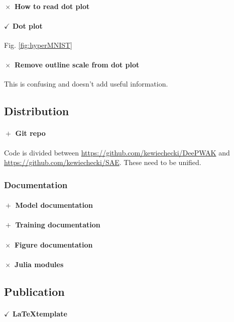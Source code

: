 \paragraph{$\boxed{\times}$ How to read dot plot}
\paragraph{$\boxed{\checkmark}$ Dot plot}
Fig. \ref{fig:hyperMNIST}
\paragraph{$\boxed{\times}$ Remove outline scale from dot plot}
This is confusing and doesn't add useful information.

\subsection{Distribution}
\paragraph{$\boxed{+}$ Git repo}
Code is divided between
\url{https://github.com/kewiechecki/DeePWAK} and
\url{https://github.com/kewiechecki/SAE}.
These need to be unified.

\subsubsection{Documentation}
\paragraph{$\boxed{+}$ Model documentation}
\paragraph{$\boxed{+}$ Training documentation}
\paragraph{$\boxed{\times}$ Figure documentation}
\paragraph{$\boxed{\times}$ Julia modules}

\subsection{Publication}
\paragraph{$\boxed{\checkmark}$ \LaTeX template}


